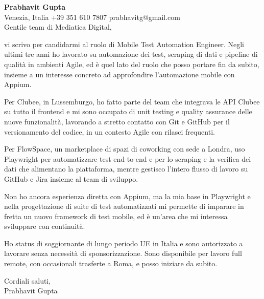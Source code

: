 \documentclass[a4paper,10.5pt]{article}
\begin{document}
\textbf{Prabhavit Gupta}\\
Venezia, Italia \textbar{} +39 351 610 7807 \textbar{} prabhavitg@gmail.com\\[10pt]
Gentile team di Mediatica Digital,

vi scrivo per candidarmi al ruolo di Mobile Test Automation Engineer. Negli ultimi tre anni ho lavorato su automazione dei test, scraping di dati e pipeline di qualità in ambienti Agile, ed è quel lato del ruolo che posso portare fin da subito, insieme a un interesse concreto ad approfondire l'automazione mobile con Appium.

Per Clubee, in Lussemburgo, ho fatto parte del team che integrava le API Clubee su tutto il frontend e mi sono occupato di unit testing e quality assurance delle nuove funzionalità, lavorando a stretto contatto con Git e GitHub per il versionamento del codice, in un contesto Agile con rilasci frequenti.

Per FlowSpace, un marketplace di spazi di coworking con sede a Londra, uso Playwright per automatizzare test end-to-end e per lo scraping e la verifica dei dati che alimentano la piattaforma, mentre gestisco l'intero flusso di lavoro su GitHub e Jira insieme al team di sviluppo.

Non ho ancora esperienza diretta con Appium, ma la mia base in Playwright e nella progettazione di suite di test automatizzati mi permette di imparare in fretta un nuovo framework di test mobile, ed è un'area che mi interessa sviluppare con continuità.

Ho status di soggiornante di lungo periodo UE in Italia e sono autorizzato a lavorare senza necessità di sponsorizzazione. Sono disponibile per lavoro full remote, con occasionali trasferte a Roma, e posso iniziare da subito.

Cordiali saluti,\\
Prabhavit Gupta
\end{document}
